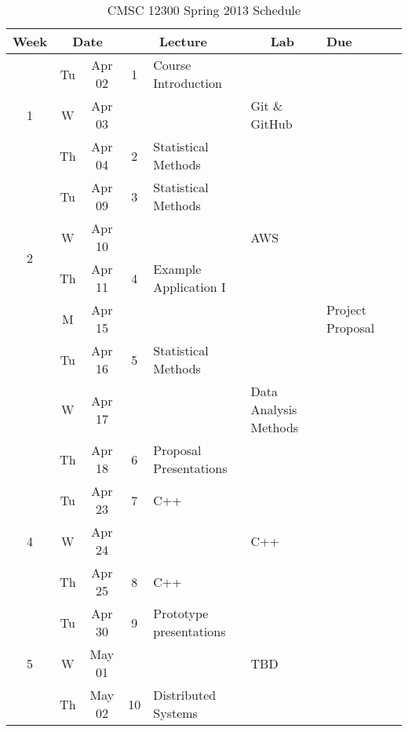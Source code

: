 \documentclass[11pt]{article}
\newcommand{\emptycell}{\cellcolor[gray]{0.9}}
\begin{document}
\begin{landscape}
\sffamily
\setlength{\extrarowheight}{4pt}
\begin{longtable}{|c|cc|c|p{7cm}|p{6cm}|p{2cm}|c|}
\caption{CMSC 12300 Spring 2013 Schedule}\label{tab:calendar}\\
\hline
\textbf{Week} & \multicolumn{2}{c|}{\textbf{Date}} & \multicolumn{ 2}{c|}{\textbf{Lecture}} & \multicolumn{1}{c|}{\textbf{Lab}} & \textbf{Due} \\ \hline
\multirow{3}{*}{1} 	& Tu & Apr 02 	& 1 		& Course Introduction 		& \emptycell  	& \emptycell \\ \cline{ 2- 8}
			& W & Apr 03	& \emptycell 	& \emptycell			& Git \& GitHub	& \emptycell \\ \cline{ 2- 8}
			& Th & Apr 04 	& 2 		& Statistical Methods      	& \emptycell  	& \emptycell \\ \hline\hline

\multirow{4}{*}{2} 	& Tu & Apr 09 	& 3 		& Statistical Methods      	& \emptycell  	& \emptycell \\ \cline{ 2- 8}
			& W & Apr 10	& \emptycell 	& \emptycell			& AWS	 	& \emptycell \\ \cline{ 2- 8}
			& Th & Apr 11 	& 4 		& Example Application I    	& \emptycell  	& \emptycell \\ \hline\hline

\multirow{3}{*}{3} 	& M & Apr 15 	& \emptycell	& \emptycell 			& \emptycell  	& Project \mbox{Proposal} \\ \cline{ 2- 8}			
			& Tu & Apr 16 	& 5 		& Statistical Methods   	& \emptycell  	& \emptycell \\ \cline{ 2- 8}
			& W & Apr 17	& \emptycell 	& \emptycell			& Data Analysis Methods	 	& \emptycell \\ \cline{ 2- 8}
			& Th & Apr 18 	& 6 		& Proposal Presentations	& \emptycell  	& \emptycell \\ \hline\hline

\multirow{3}{*}{4} 	& Tu & Apr 23 	& 7 		& C++				& \emptycell  	& \emptycell \\ \cline{ 2- 8}
			& W & Apr 24	& \emptycell 	& \emptycell			& C++	 	& \emptycell \\ \cline{ 2- 8}
			& Th & Apr 25 	& 8 		& C++			 	& \emptycell  	& \emptycell \\ \hline\hline

\multirow{3}{*}{5} 	& Tu & Apr 30 	& 9 		& Prototype presentations	& \emptycell  	& \emptycell \\ \cline{ 2- 8}
			& W & May 01	& \emptycell 	& \emptycell			& TBD	 	& \emptycell \\ \cline{ 2- 8}
			& Th & May 02 	& 10 		& Distributed Systems	 	& \emptycell  	& \emptycell \\ \hline\hline


\end{longtable}
\end{landscape}
\end{document}
